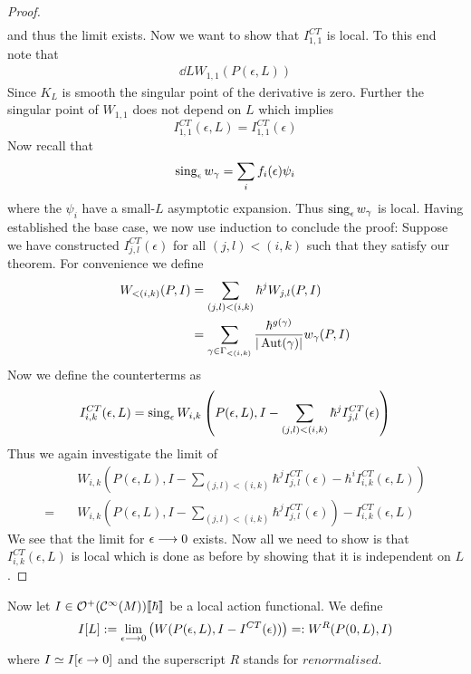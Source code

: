 \begin{theo}
\begin{proof}
\begin{align}
  \end{align}
  and thus the limit exists. Now we want to show that $I_{1,1}^{CT}$ is local. To this end note that
  \begin{align}
    \dd{}{L} W_{1,1}(P(\epsilon,L))
  \end{align}
  Since $K_L$ is smooth the singular point of the derivative is zero. Further the singular point of $W_{1,1}$ does not depend on $L$ which implies
  \begin{equation}
    I_{1,1}^{CT}(\epsilon, L) = I_{1,1}^{CT}(\epsilon)
  \end{equation}
  Now recall that
  \begin{equation}
    \sing_\epsilon w_\gamma = \sum_i f_i(\epsilon) \psi_i
  \end{equation}
  where the $\psi_i$ have a small-$L$ asymptotic expansion. Thus $\sing_\epsilon w_\gamma$ is local. Having established the base case, we now use induction to conclude the proof: Suppose we have constructed $I_{j,l}^{CT}(\epsilon)$ for all $(j,l)<(i,k)$ such that they satisfy our theorem. For convenience we define
  \begin{align}
    W_{<(i,k)} (P,I) &= \sum_{(j,l)<(i,k)} \hbar^j W_{j,l}(P,I)\\
    &= \sum_{\gamma \in \Gamma_{<(i,k)}} \frac{\hbar^{g(\gamma)}}{|\operatorname{Aut}(\gamma)|} w_\gamma (P,I)
  \end{align}
  Now we define the counterterms as
  \begin{equation}I_{i,k}^{CT}(\epsilon, L) = \sing_\epsilon W_{i,k}\left(P(\epsilon,L), I - \sum_{(j,l)<(i,k)}\hbar^j I_{j,l}^{CT}(\epsilon)\right)\end{equation}
  Thus we again investigate the limit of
  \begin{align}
    &W_{i,k}\left( P(\epsilon,L), I - \sum_{(j,l)<(i,k)}\hbar^j I_{j,l}^{CT}(\epsilon) - \hbar^i I_{i,k}^{CT}(\epsilon, L) \right)\\
    = \quad &W_{i,k}\left( P(\epsilon,L), I - \sum_{(j,l)<(i,k)}\hbar^j I_{j,l}^{CT}(\epsilon) \right) - I_{i,k}^{CT}(\epsilon, L)
  \end{align}
  We see that the limit for $\epsilon \lra 0$ exists. Now all we need to show is that $I_{i,k}^{CT}(\epsilon,L)$ is local which is done as before by showing that it is independent on $L$.
\end{proof}
\end{theo}

Now let $I \in \mathcal{O}^+(\mathcal{C}^{\infty}(M))\llbracket\hbar\rrbracket$ be a local action functional. We define
\begin{equation} I[L] := \lim_{\epsilon \lra 0} \left( W(P(\epsilon,L), I - I^{CT}(\epsilon)) \right) =: W^R(P(0,L), I)\end{equation}
where $I \simeq I[\epsilon \ra 0] $ and the superscript $R$ stands for $renormalised$.

